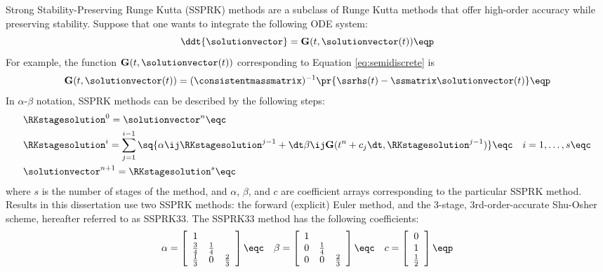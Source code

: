 Strong Stability-Preserving Runge Kutta (SSPRK) methods
\cite{gottlieb}\cite{macdonald} are a subclass of
Runge Kutta methods that offer high-order accuracy while preserving stability.
Suppose that one wants to integrate the following ODE system:
\begin{equation}
  \ddt{\solutionvector} = \mathbf{G}(t,\solutionvector(t)) \eqp
\end{equation}
For example, the function $\mathbf{G}(t,\solutionvector(t))$ corresponding
to Equation \eqref{eq:semidiscrete} is
\begin{equation}
  \mathbf{G}(t,\solutionvector(t)) = (\consistentmassmatrix)^{-1}
    \pr{\ssrhs(t) - \ssmatrix\solutionvector(t)} \eqp
\end{equation}
In $\alpha$-$\beta$ notation, SSPRK methods can be described by the following
steps:
\begin{subequations}
\begin{align}
  & \RKstagesolution^0 = \solutionvector^n \eqc \\
  & \RKstagesolution^i = \sum\limits_{j=1}^{i-1} \sq{
      \alpha\ij\RKstagesolution^{j-1}
      + \dt\beta\ij\mathbf{G}(t^n+c_j\dt, \RKstagesolution^{j-1})}
    \eqc \quad
    i = 1,\ldots,s
    \eqc \\
  & \solutionvector^{n+1} = \RKstagesolution^s \eqc
\end{align}
\end{subequations}
where $s$ is the number of stages of the method, and $\alpha$, $\beta$, and $c$
are coefficient arrays corresponding to the particular SSPRK method.
Results in this dissertation use two SSPRK methods: the forward (explicit) Euler
method, and the 3-stage, 3rd-order-accurate Shu-Osher scheme, hereafter
referred to as SSPRK33. The SSPRK33 method has the following coefficients:
\begin{equation}
  \alpha = \left[\begin{array}{c c c}
    1           &             & \\
    \frac{3}{4} & \frac{1}{4} & \\
    \frac{1}{3} & 0           & \frac{2}{3}
    \end{array}\right] \eqc \quad
  \beta = \left[\begin{array}{c c c}
    1           &             & \\
    0           & \frac{1}{4} & \\
    0           & 0           & \frac{2}{3}
    \end{array}\right] \eqc \quad
  c = \left[\begin{array}{c}
    0           \\
    1           \\
    \frac{1}{2}
    \end{array}\right] \eqp
\end{equation}
